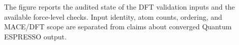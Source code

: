 The figure reports the audited state of the DFT validation inputs and the available force-level checks. Input identity, atom counts, ordering, and MACE/DFT scope are separated from claims about converged Quantum ESPRESSO output.
